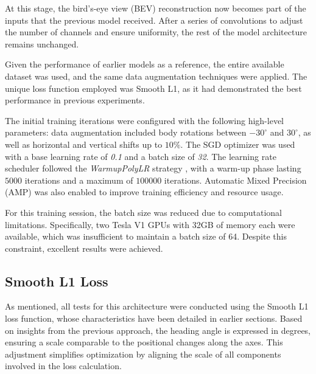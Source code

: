 At this stage, the bird’s-eye view (BEV) reconstruction now becomes part of the inputs that the previous model received. After a series of convolutions to adjust the number of channels and ensure uniformity, the rest of the model architecture remains unchanged. 

Given the performance of earlier models as a reference, the entire available dataset was used, and the same data augmentation techniques were applied. The unique loss function employed was Smooth L1, as it had demonstrated the best performance in previous experiments.

The initial training iterations were configured with the following high-level parameters: data augmentation included body rotations between $-30^\circ$ and $30^\circ$, as well as horizontal and vertical shifts up to $10\%$. The SGD optimizer was used with a base learning rate of \textit{0.1} and a batch size of \textit{32}. The learning rate scheduler followed the \textit{WarmupPolyLR} strategy \cite{kalra2024warmuplearningrateunderlying}, with a warm-up phase lasting $5000$ iterations and a maximum of $100000$ iterations. Automatic Mixed Precision (AMP) was also enabled to improve training efficiency and resource usage.

For this training session, the batch size was reduced due to computational limitations. Specifically, two Tesla V1 GPUs with 32GB of memory each were available, which was insufficient to maintain a batch size of 64. Despite this constraint, excellent results were achieved.

\subsection*{Smooth L1 Loss}

As mentioned, all tests for this architecture were conducted using the Smooth L1 loss function, whose characteristics have been detailed in earlier sections. Based on insights from the previous approach, the heading angle is expressed in degrees, ensuring a scale comparable to the positional changes along the axes. This adjustment simplifies optimization by aligning the scale of all components involved in the loss calculation.

